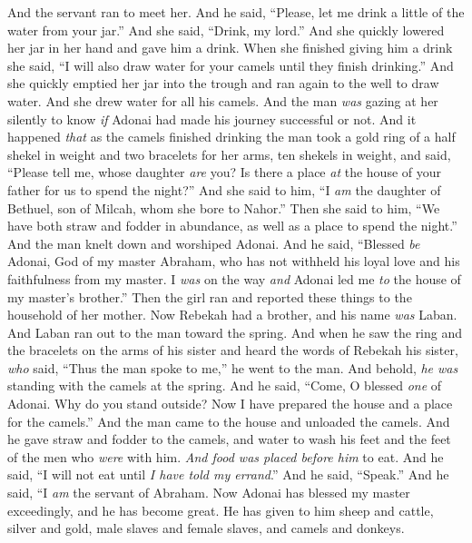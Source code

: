 \begin{biblechapter}
\verse And the servant ran to meet her. And he said, “Please, let me drink a little of the water from your jar.”
\verse And she said, “Drink, my lord.” And she quickly lowered her jar in her hand and gave him a drink.
\verse When she finished giving him a drink she said, “I will also draw water for your camels until they finish drinking.”
\verse And she quickly emptied her jar into the trough and ran again to the well to draw water. And she drew water for all his camels.
\verse And the man \textit{was} gazing at her silently to know \textit{if} Adonai had made his journey successful or not.
\verse And it happened \textit{that} as the camels finished drinking the man took a gold ring of a half shekel in weight and two bracelets for her arms, ten shekels in weight,
\verse and said, “Please tell me, whose daughter \textit{are} you? Is there a place \textit{at} the house of your father for us to spend the night?”
\verse And she said to him, “I \textit{am} the daughter of Bethuel, son of Milcah, whom she bore to Nahor.”
\verse Then she said to him, “We have both straw and fodder in abundance, as well as a place to spend the night.”
\verse And the man knelt down and worshiped Adonai.
\verse And he said, “Blessed \textit{be} Adonai, God of my master Abraham, who has not withheld his loyal love and his faithfulness from my master. I \textit{was} on the way \textit{and} Adonai led me \textit{to} the house of my master’s brother.”
\verse Then the girl ran and reported these things to the household of her mother.
\verse Now Rebekah had a brother, and his name \textit{was} Laban. And Laban ran out to the man toward the spring.
\verse And when he saw the ring and the bracelets on the arms of his sister and heard the words of Rebekah his sister, \textit{who} said, “Thus the man spoke to me,” he went to the man. And behold, \textit{he was} standing with the camels at the spring.
\verse And he said, “Come, O blessed \textit{one} of Adonai. Why do you stand outside? Now I have prepared the house and a place for the camels.”
\verse And the man came to the house and unloaded the camels. And he gave straw and fodder to the camels, and water to wash his feet and the feet of the men who \textit{were} with him.
\verse \textit{And food was placed before him} to eat. And he said, “I will not eat until \textit{I have told my errand}.” And he said, “Speak.”
\verse And he said, “I \textit{am} the servant of Abraham.
\verse Now Adonai has blessed my master exceedingly, and he has become great. He has given to him sheep and cattle, silver and gold, male slaves and female slaves, and camels and donkeys.

\end{biblechapter}
